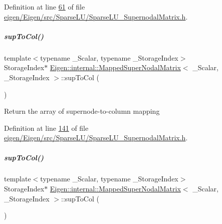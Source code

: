 Definition at line \hyperlink{eigen_2_eigen_2src_2_sparse_l_u_2_sparse_l_u___supernodal_matrix_8h_source_l00061}{61} of file \hyperlink{eigen_2_eigen_2src_2_sparse_l_u_2_sparse_l_u___supernodal_matrix_8h_source}{eigen/\+Eigen/src/\+Sparse\+L\+U/\+Sparse\+L\+U\+\_\+\+Supernodal\+Matrix.\+h}.

\mbox{\label{group___sparse_l_u___module_ab2b1bdd663288f1f2af09ec42a0a62a5}} 
\subparagraph{\texorpdfstring{sup\+To\+Col()}{supToCol()}\hspace{0.1cm}{\footnotesize\ttfamily [1/2]}}
{\footnotesize\ttfamily template$<$typename \+\_\+\+Scalar, typename \+\_\+\+Storage\+Index$>$ \\
Storage\+Index$\ast$ \hyperlink{group___sparse_l_u___module_class_eigen_1_1internal_1_1_mapped_super_nodal_matrix}{Eigen\+::internal\+::\+Mapped\+Super\+Nodal\+Matrix}$<$ \+\_\+\+Scalar, \+\_\+\+Storage\+Index $>$\+::sup\+To\+Col (\begin{DoxyParamCaption}{ }\end{DoxyParamCaption})\hspace{0.3cm}{\ttfamily [inline]}}

Return the array of supernode-\/to-\/column mapping 

Definition at line \hyperlink{eigen_2_eigen_2src_2_sparse_l_u_2_sparse_l_u___supernodal_matrix_8h_source_l00141}{141} of file \hyperlink{eigen_2_eigen_2src_2_sparse_l_u_2_sparse_l_u___supernodal_matrix_8h_source}{eigen/\+Eigen/src/\+Sparse\+L\+U/\+Sparse\+L\+U\+\_\+\+Supernodal\+Matrix.\+h}.

\mbox{\label{group___sparse_l_u___module_ab2b1bdd663288f1f2af09ec42a0a62a5}} 
\subparagraph{\texorpdfstring{sup\+To\+Col()}{supToCol()}\hspace{0.1cm}{\footnotesize\ttfamily [2/2]}}
{\footnotesize\ttfamily template$<$typename \+\_\+\+Scalar, typename \+\_\+\+Storage\+Index$>$ \\
Storage\+Index$\ast$ \hyperlink{group___sparse_l_u___module_class_eigen_1_1internal_1_1_mapped_super_nodal_matrix}{Eigen\+::internal\+::\+Mapped\+Super\+Nodal\+Matrix}$<$ \+\_\+\+Scalar, \+\_\+\+Storage\+Index $>$\+::sup\+To\+Col (\begin{DoxyParamCaption}{ }\end{DoxyParamCaption})\hspace{0.3cm}{\ttfamily [inline]}}

